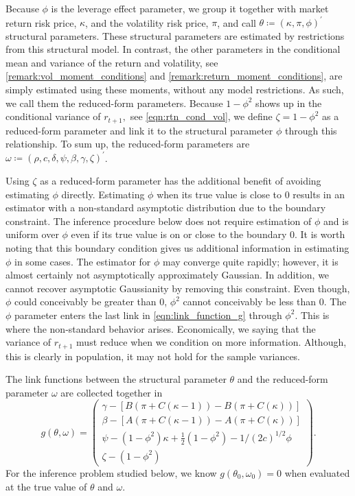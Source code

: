 Because $\phi$ is the leverage effect parameter, we group it together with market return risk price, $\kappa$, and the volatility risk price, $\pi$, and call $ \theta \coloneqq (\kappa ,\pi ,\phi )^{\prime}$ structural parameters. These structural parameters are estimated by restrictions from this structural model. In contrast, the other parameters in the conditional mean and variance of the return and volatility, see \cref{remark:vol_moment_conditions} and \cref{remark:return_moment_conditions}, are simply estimated using these moments, without any model restrictions. As such, we call them the reduced-form parameters. Because $1-\phi ^{2}$ shows up in the conditional variance of $r_{t+1},$ see \cref{eqn:rtn_cond_vol}, we define $\zeta =1-\phi ^{2}$ as a reduced-form parameter and link it to the structural parameter $\phi$ through this relationship. To sum up, the reduced-form parameters are $\omega \coloneqq (\rho, c,\delta, \psi, \beta, \gamma, \zeta )^{\prime }$.

Using $\zeta $ as a reduced-form parameter has the additional benefit of avoiding estimating $\phi$ directly. Estimating $\phi $ when its true value is close to 0 results in an estimator with a non-standard asymptotic distribution due to the boundary constraint. The inference procedure below does not require estimation of $\phi$ and is uniform over $\phi$ even if its true value is on or close to the boundary $0$. It is worth noting that this boundary condition gives us additional information in estimating $\phi$ in some cases. The estimator for $\phi$ may converge quite rapidly; however, it is almost certainly not asymptotically approximately Gaussian. In addition, we cannot recover asymptotic Gaussianity by removing this constraint. Even though, $\phi$ could conceivably be greater than $0$, $\phi^2$ cannot conceivably be  less than $0$. The $\phi$ parameter enters the last link in \cref{eqn:link_function_g} through $\phi^2$.
This is where the non-standard behavior arises. Economically, we saying that the variance of $r_{t+1}$ must reduce when we condition on more information. Although, this is clearly in population, it may not hold for the sample variances.

The link functions between the structural parameter $\theta$ and the reduced-form parameter $\omega $ are collected together in
%
\begin{equation}
    \label{eqn:link_function_g}
   g(\theta, \omega) = 
%
    \begin{pmatrix}
        \gamma - [B\left( \pi +C\left( \kappa -1\right) \right) -B\left( \pi +C\left( \kappa \right) \right)] \\ 
        \beta - [A\left( \pi +C\left( \kappa -1\right) \right) -A\left( \pi +C\left( \kappa \right) \right)] \\ 
        \psi -(1-\phi ^{2})\kappa +\frac{1}{2}(1-\phi ^{2})-1/(2c)^{1/2}\phi  \\ 
        \zeta -\left( 1-\phi ^{2}\right) 
    \end{pmatrix}.
\end{equation}
%
For the inference problem studied below, we know $g(\theta _{0},\omega_{0})=0$ when evaluated at the true value of $\theta $ and $\omega .$

